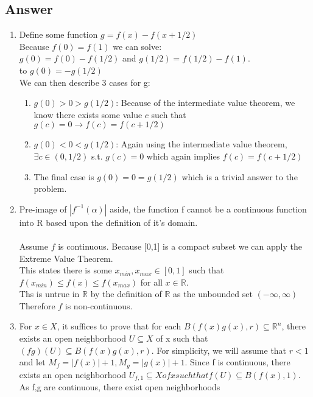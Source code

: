\documentclass{article}
\begin{document}
\subsection*{Answer}
\begin{enumerate}[label=(\alph*)]
	\item
		Define some function \(g = f(x) -f(x + 1/2)\) \\
		Because \(f(0) = f(1)\) we can solve:\\
		 \(g(0) = f(0) - f(1/2)\) and \(g(1/2) = f(1/2) - f(1)\). \\
		to \(g(0) = -g(1/2)\) \\
		We can then describe 3 cases for g: \\
		\begin{enumerate}
		\item
			\(g(0) > 0 > g(1/2)\): Because of the intermediate value theorem, we know there exists some value \(c\) such
			that \(g(c) = 0 \to f(c) = f(c + 1/2)\)
		\item 
			\(g(0) < 0 < g(1/2)\): Again using the intermediate value theorem, \(\exists c \in (0,1/2)\) s.t. \(g(c) = 0\) 
			which again implies \(f(c) = f(c + 1/2)\)
		\item 
			The final case is \(g(0) = 0 = g(1/2)\) which is a trivial answer to the problem.
		\end{enumerate}
	\item
		Pre-image of \(|f^{-1}(\alpha)|\) aside, the function f cannot be a continuous function into R based upon the definition
		of it's domain. \\\\
		Assume \(f\) is continuous. Because [0,1] is a compact subset we can apply the Extreme Value Theorem. \\
		This states there is some \(x_{min},x_{max} \in [0,1]\) such that \(f(x_{min}) \le f(x) \le f(x_{max})\) for all 
		\(x\in \mathbb{R}\). \\
		Ths is untrue in \(\mathbb{R}\) by the definition of \(\mathbb{R}\) as the unbounded set \((-\infty,\infty)\) \\
		Therefore \(f\) is non-continuous.
	\item
		For \(x\in  X\), it suffices to prove that for each \(B(f(x)g(x),r) \subseteq \mathbb{R}^{n}\), there exists an open
		neighborhood \(U \subseteq X\) of x such that \((f g)(U) \subseteq B(f(x)g(x),r)\). For simplicity, we will assume
		that \(r < 1\) and let \(M_{f} = | f(x)| + 1, M_{g} = |g(x)| + 1\). Since f is continuous, there exists an open neighborhood 
		\(U_{f,1} \subseteq X of x such that f(U) \subseteq B(f(x),1)\). As f,g are continuous, there exist open neighborhoods 

\end{enumerate}
\end{document}
